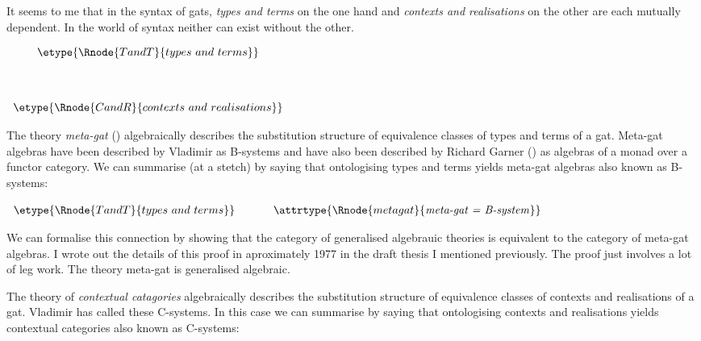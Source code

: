 
\note It seems to me that in the syntax of gats, \textit{types and terms} on the one hand and \textit{contexts and realisations} on the other are each mutually dependent. In the world 
of syntax neither can exist without the other.
\begin{center}
$
\begin{array}{ c }
\etype{\Rnode{TandT}{types\ and\ terms}} \\[1.3cm]
\etype{\Rnode{CandR}{contexts\ and\ realisations}}   
\end{array}                     
$
\setlength{\sarnodesepA}{7pt}
\setlength{\sarnodesepB}{7pt}
\setlength{\saroffsetA}{7pt}
\setlength{\saroffsetB}{7pt}
\end{center}

\note The theory \textit{meta-gat} (\cite{Cartmell14B}) algebraically describes the substitution structure of equivalence classes of types and terms of a gat. Meta-gat algebras have been described by Vladimir as B-systems and have also been described by Richard Garner (\cite{Garner15}) as algebras of a monad over a functor category.  We can summarise (at a stetch) by saying that ontologising types and terms yields meta-gat algebras also known as B-systems:

\begin{center}
$
\begin{array}{ c p{0.5cm} c}
\etype{\Rnode{TandT}{types\ and\ terms}} & & \attrtype{\Rnode{metagat}{\mbox{\textit{meta-gat = B-system}}}}
\end{array}                     
$
\setlength{\arrnodesepA}{7pt}
\setlength{\arrnodesepB}{7pt}
\end{center}

We can formalise this connection by showing that the category of generalised algebrauic theories 
is equivalent to the category of meta-gat algebras.  I wrote out the details of this proof in aproximately 1977 in the draft thesis I mentioned previously. The proof just involves a lot of leg work. The theory meta-gat is generalised algebraic.
 
\note The theory of \textit{contextual catagories} algebraically describes the substitution structure of equivalence classes of contexts and realisations of a gat. Vladimir has called  these C-systems. In this case we can summarise by saying that ontologising contexts and realisations yields contextual categories also known as C-systems:

